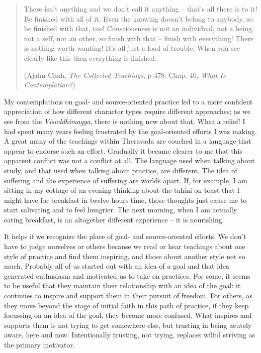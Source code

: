 \begin{quotation}
There isn't anything and we don't call it anything -- that's all there
is to it! Be finished with all of it. Even the knowing doesn't belong to
anybody, so be finished with that, too! Consciousness is not an
individual, not a being, not a self, not an other, so finish with that
-- finish with everything! There is nothing worth wanting! It's all just
a load of trouble. When you see clearly like this then everything is
finished.

(Ajahn Chah, \emph{The Collected Teachings}\cite{collected}, p 478: Chap. 40, \emph{What Is Contemplation?})
\end{quotation}

My contemplations on goal- and source-oriented practice led to a more
confident appreciation of how different character types require
different approaches; as we see from the \emph{Visuddhimagga}, there is
nothing new about that. What a relief! I had spent many years feeling frustrated
by the goal-oriented efforts I was making. A great many of the teachings within
Theravada are couched in a language that appear to endorse such an
effort. Gradually it became clearer to me that this apparent conflict
was not a conflict at all. The language used when talking about study,
and that used when talking about practice, are different. The idea of
suffering and the experience of suffering are worlds apart. If, for
example, I am sitting in my cottage of an evening thinking about the
tahini on toast that I might have for breakfast in twelve hours time,
those thoughts just cause me to start salivating and to feel hungrier.
The next morning, when I am actually eating breakfast, is an altogether
different experience -- it is nourishing.

It helps if we recognize the place of goal- and source-oriented efforts.
We don't have to judge ourselves or others because we read or hear
teachings about one style of practice and find them inspiring, and those
about another style not so much. Probably all of us started out with an
idea of a goal and that idea generated enthusiasm and motivated us to
take on practices. For some, it seems to be useful that they maintain
their relationship with an idea of the goal: it continues to inspire and
support them in their pursuit of freedom. For others, as they move
beyond the stage of initial faith in this path of practice, if they keep
focussing on an idea of the goal, they become more confused. What
inspires and supports them is not trying to get somewhere else, but
trusting in being acutely aware, here and now. Intentionally trusting,
not trying, replaces wilful striving as the primary motivator.

